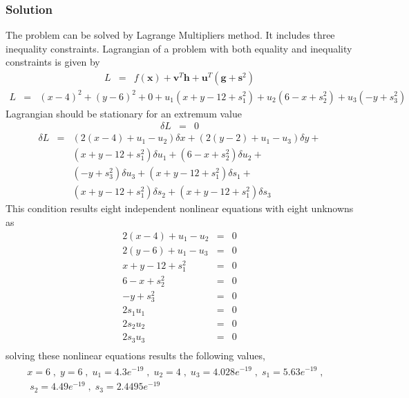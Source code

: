\documentclass[]{report}
\begin{document}
\subsubsection*{Solution}
The problem can be solved by Lagrange Multipliers method. It includes three inequality constraints. Lagrangian of a problem with both equality and inequality constraints is given by 
\begin{eqnarray*}
L &=&f\left(\mathbf x\right) + \mathbf{v}^T\mathbf{h}+\mathbf{u}^T\left(\mathbf{g}+\mathbf{s}^2\right)
\end{eqnarray*}
\begin{eqnarray*}
L&=&\left(x-4\right)^2+\left(y-6\right)^2+0+u_1\left(x+y-12+s_1^2\right)+u_2\left(6-x+s_2^2\right)+u_3\left(-y+s_3^2\right)
\end{eqnarray*}
Lagrangian should be stationary for an extremum value 
\begin{eqnarray*}
\delta L &=&0
\end{eqnarray*}
\begin{eqnarray*}
\delta L &=& \left(2\left(x-4\right)+u_1-u_2\right) \delta x +\left(2\left(y-2\right)+u_1-u_3\right)\delta y+\\
&&\left(x+y-12+s_1^2\right)\delta u_1+\left(6-x+s_2^2\right)\delta u_2+\\
&&\left(-y+s_3^2\right)\delta u_3+\left(x+y-12+s_1^2\right)\delta s_1+\\
&&\left(x+y-12+s_1^2\right)\delta s_2+\left(x+y-12+s_1^2\right)\delta s_3
\end{eqnarray*}
This condition results eight independent nonlinear equations with eight unknowns as
\begin{eqnarray*}
2\left(x-4\right)+u_1-u_2&=&0\\
2\left(y-6\right)+u_1-u_3&=&0\\
x+y-12+s_1^2&=&0\\
6-x+s_2^2&=&0\\
-y+s_3^2&=&0\\
2s_1u_1&=&0\\
2s_2u_2&=&0\\
2s_3u_3&=&0\\
\end{eqnarray*}
solving these nonlinear equations results the following values,
\begin{eqnarray*}
\begin{array}{lc}
 x=6\;,\;y=6\;,\;u_1=4.3e^{-19}\;,\;u_2=4\;,\;u_3=4.028e^{-19}\;,\;s_1=5.63e^{-19}\;,&\\ \;s_2=4.49e^{-19}\;,\;s_3=2.4495e^{-19}&
 \end{array}
\end{eqnarray*}
\end{document}
